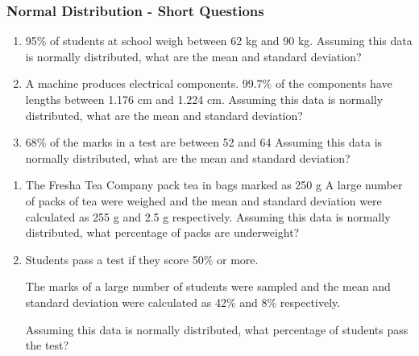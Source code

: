 \documentclass[IntroMain.tex]{subfiles}
\begin{document}
\begin{frame}


\frametitle{Normal Distribution - Short Questions}


\begin{enumerate}
\item 95\% of students at school weigh between 62 kg and 90 kg.
Assuming this data is normally distributed, what are the mean and standard deviation?

\item A machine produces electrical components.
99.7\% of the components have lengths between 1.176 cm and 1.224 cm.
Assuming this data is normally distributed, what are the mean and standard deviation?

\item 68\% of the marks in a test are between 52 and 64
Assuming this data is normally distributed, what are the mean and standard deviation?
\end{enumerate}
\end{frame}
\begin{frame}
	\begin{enumerate}
\item The Fresha Tea Company pack tea in bags marked as 250 g
A large number of packs of tea were weighed and the mean and standard deviation were calculated as 255 g and 2.5 g respectively.
Assuming this data is normally distributed, what percentage of packs are underweight?

\item Students pass a test if they score 50\% or more.

The marks of a large number of students were sampled and the mean and standard deviation were calculated as 42\% and 8\% respectively.

Assuming this data is normally distributed, what percentage of students pass the test?

\end{enumerate}
\end{frame}
\end{document}
